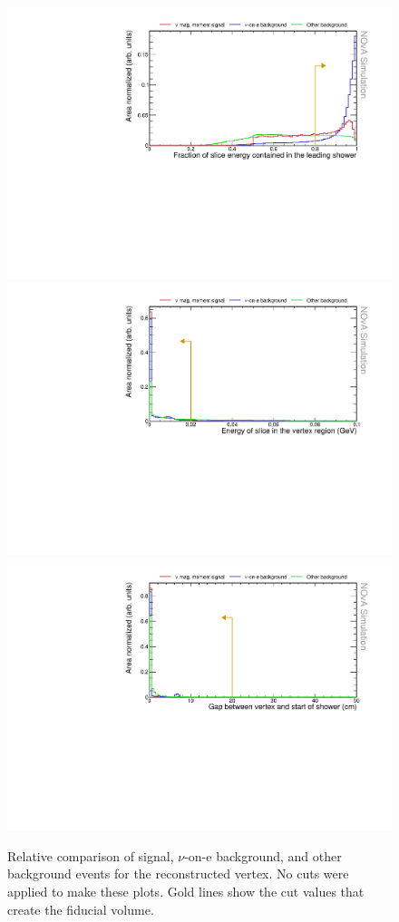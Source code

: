 \begin{figure}[hbtp]
\centering
\includegraphics[width=.9\textwidth]{Plots/NuMMEventSelection/N1Cut_showerEFrac.pdf}
\includegraphics[width=.9\textwidth]{Plots/NuMMEventSelection/N1Cut_vtxE.pdf}
\includegraphics[width=.9\textwidth]{Plots/NuMMEventSelection/N1Cut_gap.pdf}
\caption{Relative comparison of signal, $\nu$-on-e background, and other background events for the reconstructed vertex. No cuts were applied to make these plots. Gold lines show the cut values that create the fiducial volume.}
\label{fig:SingleShowerCuts}
\end{figure}

